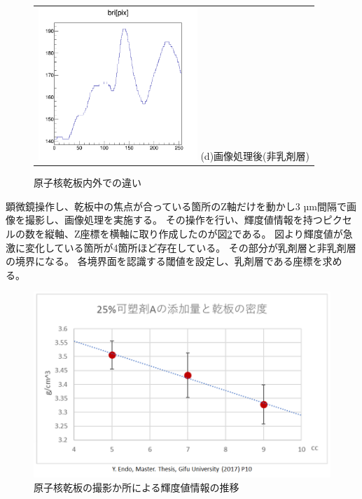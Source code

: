 \documentclass[12pt,a4paper]{jarticle}
\begin{document}
\begin{figure}[htbp]
\begin{tabular}{c}
        \begin{minipage}{0.5\hsize}
          \centering
              \includegraphics[clip, width=60mm]{gau2_hist.png}
              \hspace{1.6cm} (d)画像処理後(非乳剤層)
        \end{minipage}
    
      \end{tabular}
      \caption{原子核乾板内外での違い\label{fig:do_hyoumenn_outin_image}}
\end{figure}
\par
顕微鏡操作し、乾板中の焦点が合っている箇所のZ軸だけを動かし3 µm間隔で画像を撮影し、画像処理を実施する。
その操作を行い、輝度値情報を持つピクセルの数を縦軸、Z座標を横軸に取り作成したのが図\ref{fig:hyoumenn_kidoti}である。
図より輝度値が急激に変化している箇所が4箇所ほど存在している。
その部分が乳剤層と非乳剤層の境界になる。
各境界面を認識する閾値を設定し、乳剤層である座標を求める。
\begin{figure}[htbp]
  \centering
     \includegraphics[width=140mm]{kasozai.png}
  \caption{原子核乾板の撮影か所による輝度値情報の推移\label{fig:hyoumenn_kidoti}}
\end{figure}
\end{document}
